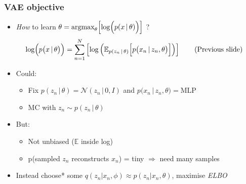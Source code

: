 \documentclass[xcolor=table,dvipsnames]{beamer}
\begin{document}
\begin{frame}[t]
    \frametitle{VAE objective}
    \begin{itemize}
        \setlength{\itemsep}{0.5em}
        \item \emph{How} to learn $\theta = \text{argmax}_\theta\Bigl[ \log\Bigl( p(x \,|\, \theta) \Bigr) \Bigr]$ ?
        \begin{align*}
            \log\Bigl( p\bigl(x \,\vert\, \theta\bigr) \Bigr) &= \sum_{n=1}^N \left[ \log\left( \mathbb{E}_{p( z_n \,\vert\, \theta )} \Bigl[ p\bigl( x_n \,\vert\, z_n, \theta \bigr) \Bigr] \right) \right] \tag{Previous slide}
        \end{align*}
        \item Could:
        \begin{itemize}
            \vspace{0.5em}
            \setlength{\itemsep}{0.5em}
            \item Fix $p( z_n \,\vert\, \theta ) = \mathcal{N}(z_n \,|\, 0, I)$ and $p\bigl( x_n \,\vert\, z_n, \theta \bigr) = \text{MLP}$
            \item MC with $z_n \sim p( z_n \,\vert\, \theta )$
        \end{itemize}
        \item But:
        \begin{itemize}
            \vspace{0.5em}
            \setlength{\itemsep}{0.5em}
            \item Not unbiased ($\mathbb{E}$ inside log)
            \item p(sampled $z_n$ reconstructs $x_n$) = tiny $\Rightarrow$ need many samples
        \end{itemize}
        \item Instead choose* some $q(z_n \vert x_n, \phi) \approx p(z_n \vert x_n, \theta)$, maximise \emph{ELBO}
    \end{itemize}
\end{frame}
\end{document}
